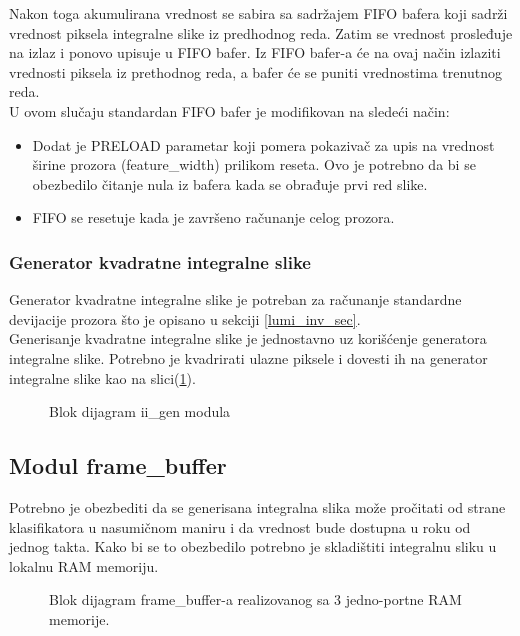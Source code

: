 Nakon toga akumulirana vrednost se sabira sa sadržajem FIFO bafera koji sadrži
vrednost piksela integralne slike iz predhodnog reda.
Zatim se vrednost prosleđuje na izlaz i ponovo upisuje u FIFO bafer.
Iz FIFO bafer-a će na ovaj način izlaziti vrednosti piksela iz prethodnog reda,
a bafer će se puniti vrednostima trenutnog reda. \\

\noindent
U ovom slučaju standardan FIFO bafer je modifikovan na sledeći način:
\begin{itemize}
  \item Dodat je PRELOAD parametar koji pomera pokazivač za upis na vrednost
    širine prozora (feature\_width) prilikom reseta. Ovo je potrebno da bi se
    obezbedilo čitanje nula iz bafera kada se obrađuje prvi red slike.
  \item FIFO se resetuje kada je završeno računanje celog prozora.
\end{itemize}

\subsubsection{Generator kvadratne integralne slike}\label{sii_gen_sec}

Generator kvadratne integralne slike je potreban za računanje standardne
devijacije prozora što je opisano u sekciji \ref{lumi_inv_sec}. \\
Generisanje kvadratne integralne slike je jednostavno uz korišćenje generatora
integralne slike.
Potrebno je kvadrirati ulazne piksele i dovesti ih na generator integralne slike
kao na slici(\ref{sii_gen}).

\begin{figure}[H]
  \centering
  \resizebox{0.7\textwidth}{!}{%
    
    }
\caption{Blok dijagram ii\_gen modula}
\label{sii_gen}
\end{figure}

\subsection{Modul frame\_buffer}

Potrebno je obezbediti da se generisana integralna slika može pročitati od
strane klasifikatora u nasumičnom maniru i da vrednost bude dostupna u roku od
jednog takta.
Kako bi se to obezbedilo potrebno je skladištiti integralnu sliku u lokalnu RAM
memoriju. \\

\begin{figure}[H]
  \centering
  \resizebox{0.85\textwidth}{!}{%
    
    }
\caption{Blok dijagram frame\_buffer-a realizovanog sa 3 jedno-portne RAM memorije.}
\label{frame_buffer_bd}
\end{figure}

